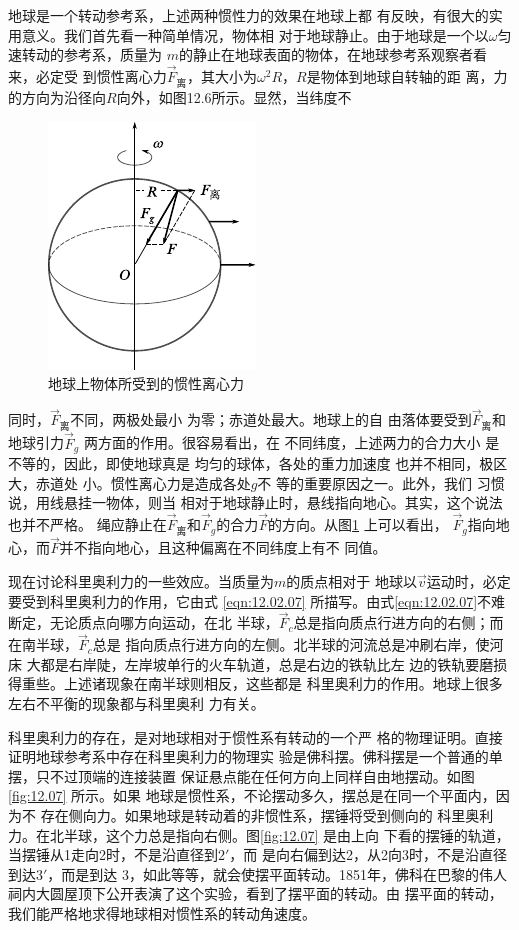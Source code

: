 地球是一个转动参考系，上述两种惯性力的效果在地球上都
有反映，有很大的实用意义。我们首先看一种简单情况，物体相
对于地球静止。由于地球是一个以$ \omega $匀速转动的参考系，质量为
$ m $的静止在地球表面的物体，在地球参考系观察者看来，必定受
到惯性离心力$ \vec{F}_\text{离} $，其大小为$  \omega ^ { 2 } R   $，$ R $是物体到地球自转轴的距
离，力的方向为沿径向$ R $向外，如图12.6所示。显然，当纬度不
\begin{figure}
    \centering
    \includegraphics{figure/fig12.06}
    \caption{地球上物体所受到的惯性离心力}
    \label{fig:12.06}
\end{figure}
同时，$ \vec{F}_\text{离} $不同，两极处最小
为零；赤道处最大。地球上的自
由落体要受到$ \vec{F}_\text{离} $和地球引力$ \vec{F}_g $
两方面的作用。很容易看出，在
不同纬度，上述两力的合力大小
是不等的，因此，即使地球真是
均匀的球体，各处的重力加速度
也并不相同，极区大，赤道处
小。惯性离心力是造成各处$ g $不
等的重要原因之一。此外，我们
习惯说，用线悬挂一物体，则当
相对于地球静止时，悬线指向地心。其实，这个说法也并不严格。
绳应静止在$ \vec{F}_\text{离} $和$ \vec{F}_g $的合力$ \vec{F} $的方向。从图\ref{fig:12.06} 上可以看出，
$ \vec{F}_g $指向地心，而$ \vec{F} $并不指向地心，且这种偏离在不同纬度上有不
同值。

现在讨论科里奥利力的一些效应。当质量为$ m $的质点相对于
地球以$\vec{v}$运动时，必定要受到科里奥利力的作用，它由式 \eqref{eqn:12.02.07}
所描写。由式\eqref{eqn:12.02.07}不难断定，无论质点向哪方向运动，在北
半球，$ \vec{F}_c $总是指向质点行进方向的右侧；而在南半球，$ \vec{F}_c $总是
指向质点行进方向的左侧。北半球的河流总是冲刷右岸，使河床
大都是右岸陡，左岸坡单行的火车轨道，总是右边的铁轨比左
边的铁轨要磨损得重些。上述诸现象在南半球则相反，这些都是
科里奥利力的作用。地球上很多左右不平衡的现象都与科里奥利
力有关。

科里奥利力的存在，是对地球相对于惯性系有转动的一个严
格的物理证明。直接证明地球参考系中存在科里奥利力的物理实
验是佛科摆。佛科摆是一个普通的单摆，只不过顶端的连接装置
保证悬点能在任何方向上同样自由地摆动。如图\ref{fig:12.07} 所示。如果
地球是惯性系，不论摆动多久，摆总是在同一个平面内，因为不
存在侧向力。如果地球是转动着的非惯性系，摆锤将受到侧向的
科里奥利力。在北半球，这个力总是指向右侧。图\ref{fig:12.07} 是由上向
下看的摆锤的轨道，当摆锤从1走向2时，不是沿直径到$ 2' $，而
是向右偏到达2，从2向3时，不是沿直径到达$ 3' $，而是到达
3，如此等等，就会使摆平面转动。1851年，佛科在巴黎的伟人
祠内大圆屋顶下公开表演了这个实验，看到了摆平面的转动。由
摆平面的转动，我们能严格地求得地球相对惯性系的转动角速度。

